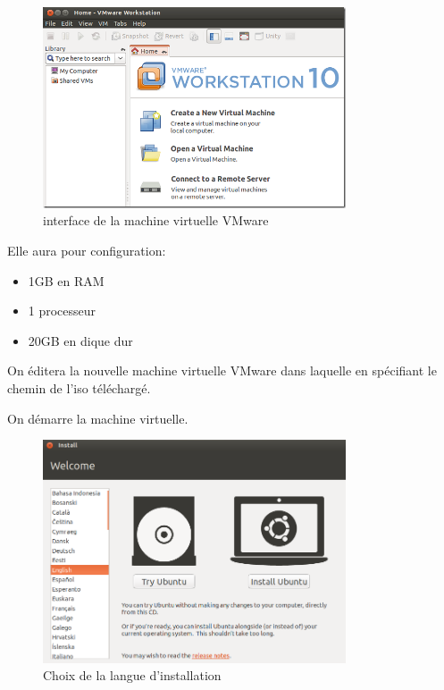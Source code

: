 \documentclass[11pt,a4paper,titlepage, oneside]{article}
\begin{document}
		\begin{figure}[htp]
  			\centering
  			\includegraphics[width=0.8\textwidth,natwidth=610,natheight=642]{images/vmwareworkstationubuntu.png}
			\caption{interface de la machine virtuelle VMware}
		\end{figure}
		
		Elle aura pour configuration:
		\begin{itemize}
                        \item{1GB en RAM}
                        \item{1 processeur}
                        \item{20GB en dique dur}
                \end{itemize}
		On éditera la nouvelle machine virtuelle VMware dans laquelle en spécifiant le chemin de l'iso téléchargé.
		
		On démarre la machine virtuelle.
	
		\begin{figure}[htp]
                        \centering
                        \includegraphics[width=0.8\textwidth,natwidth=610,natheight=642]{images/demarrerISO.png}
                        \caption{Choix de la langue d'installation}
		\end{figure}
		         
\end{document}
